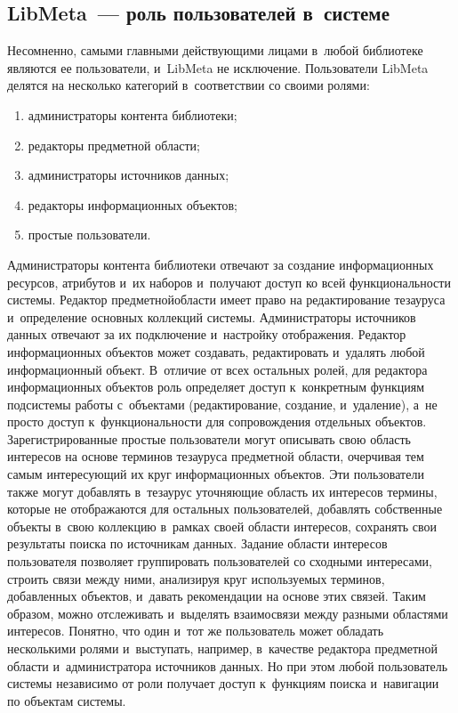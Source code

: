 \begin{multicols}{2}





    
\section{LibMeta~--- роль пользователей в~системе}

    Несомненно, самыми главными действующими лицами в~любой 
библиотеке являются ее пользователи, и~LibMeta не исключение. 
Пользователи LibMeta делятся на несколько категорий в~соответствии со 
своими ролями: 
    \begin{enumerate}[(1)]
\item администраторы контента библиотеки; 
\item редакторы предметной области; 
\item администраторы источников данных; 
\item редакторы информационных объектов; 
\item простые пользователи.
\end{enumerate}




    Администраторы контента библиотеки отвечают за создание 
информационных ресурсов, атрибутов и~их наборов и~получают доступ ко 
всей функциональности системы. Редактор предметной\linebreak об\-ласти имеет право 
на редактирование тезауруса и~определение основных коллекций системы.\linebreak 
Адми\-нистраторы источников данных отвечают за их подключение 
и~настройку отображения. Редак\-тор информационных объектов может 
создавать, редактировать и~удалять любой информационный объект. 
В~отличие от всех остальных ролей, для редактора информационных 
объектов роль определяет доступ к~конкретным функциям подсистемы 
рабо\-ты с~объектами (редактирование, создание, и~удаление), а~не просто 
доступ к~функциональ\-ности для сопровождения отдельных объектов. 
Зарегистрированные простые пользователи могут описывать свою об\-ласть 
интересов на основе терминов тезауруса предметной об\-ласти, очерчивая тем 
самым интересующий их круг информационных объектов. Эти пользователи 
также могут добавлять в~тезаурус уточняющие об\-ласть их интересов 
термины, которые не отображаются для остальных пользователей, добавлять 
собственные объекты в~свою коллекцию в~рамках своей об\-ласти интересов, 
сохранять свои результаты поиска по источникам данных. Задание об\-ласти 
интересов пользователя позволяет группировать пользователей со сходными 
интересами, строить связи между ними, анализируя круг 
используемых терминов, добавленных объектов, и~давать 
рекомендации на основе этих связей. Таким образом, можно отслеживать 
и~выделять взаимосвязи между разными об\-лас\-тя\-ми интересов. Понятно, что 
один и~тот же пользователь может обладать несколькими ролями 
и~выступать, например, в~качестве редактора предметной об\-ласти 
и~администратора источников данных. Но при этом любой пользователь 
системы независимо от роли получает доступ к~функциям поиска 
и~навигации по объектам системы.
    

\end{multicols}
